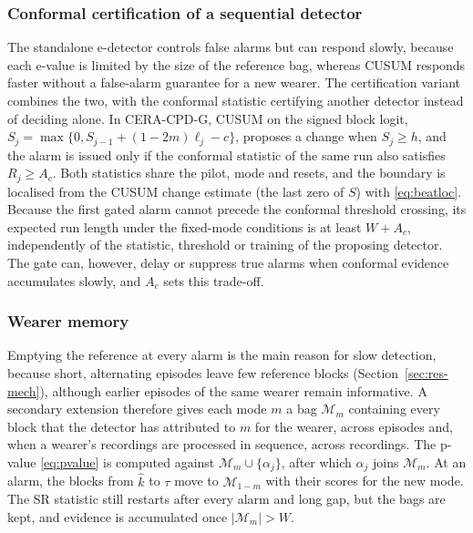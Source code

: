 \documentclass[preprint,12pt]{elsarticle}
\newcommand{\method}{CERA-CPD}
\newcommand{\1}{\mathbf{1}}
\begin{document}
\subsubsection{Conformal certification of a sequential detector}
\label{sec:gate}
The standalone e-detector controls false alarms but can respond slowly, because each e-value is limited by the size of the reference bag, whereas CUSUM responds faster without a false-alarm guarantee for a new wearer. The certification variant combines the two, with the conformal statistic certifying another detector instead of deciding alone. In \method{}-G, CUSUM on the signed block logit, $S_j=\max\{0,S_{j-1}+(1-2m)\ell_j-c\}$, proposes a change when $S_j\ge h$, and the alarm is issued only if the conformal statistic of the same run also satisfies $R_j\ge A_c$. Both statistics share the pilot, mode and resets, and the boundary is localised from the CUSUM change estimate (the last zero of $S$) with \eqref{eq:beatloc}. Because the first gated alarm cannot precede the conformal threshold crossing, its expected run length under the fixed-mode conditions is at least $W+A_c$, independently of the statistic, threshold or training of the proposing detector. The gate can, however, delay or suppress true alarms when conformal evidence accumulates slowly, and $A_c$ sets this trade-off.

\subsubsection{Wearer memory}
\label{sec:memory}
Emptying the reference at every alarm is the main reason for slow detection, because short, alternating episodes leave few reference blocks (Section~\ref{sec:res-mech}), although earlier episodes of the same wearer remain informative. A secondary extension therefore gives each mode $m$ a bag $\mathcal M_m$ containing every block that the detector has attributed to $m$ for the wearer, across episodes and, when a wearer's recordings are processed in sequence, across recordings. The p-value \eqref{eq:pvalue} is computed against $\mathcal M_m\cup\{\alpha_j\}$, after which $\alpha_j$ joins $\mathcal M_m$. At an alarm, the blocks from $\hat k$ to $\tau$ move to $\mathcal M_{1-m}$ with their scores for the new mode. The SR statistic still restarts after every alarm and long gap, but the bags are kept, and evidence is accumulated once $|\mathcal M_m|>W$.
\end{document}
